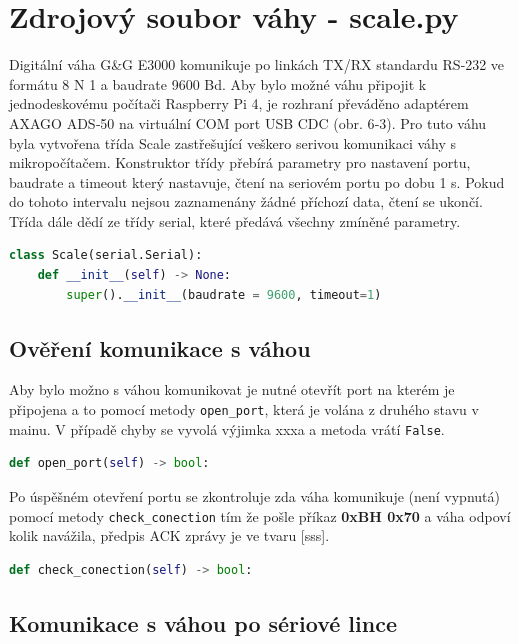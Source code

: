 \section{Zdrojový soubor váhy - scale.py}
\label{sec: scale.py}
Digitální váha G\&G E3000 komunikuje po linkách TX/RX standardu RS‑232 ve formátu 8 N 1 a baudrate 9600 Bd. Aby bylo možné váhu připojit k jednodeskovému počítači Raspberry Pi 4, je rozhraní převáděno adaptérem AXAGO ADS‑50 na virtuální COM port USB CDC (obr. 6‑3). Pro tuto váhu byla vytvořena třída Scale zastřešující veškero serivou komunikaci váhy s mikropočítačem. Konstruktor třídy přebírá parametry pro nastavení portu, baudrate a timeout který nastavuje, čtení na seriovém portu po dobu 1 s. Pokud do tohoto intervalu nejsou zaznamenány žádné příchozí data, čtení se ukončí. Třída dále dědí ze třídy serial, které předává všechny zmíněné parametry.

\begin{lstlisting}[language=Python,breaklines=false, frame=single]
class Scale(serial.Serial):
    def __init__(self) -> None:
        super().__init__(baudrate = 9600, timeout=1)
\end{lstlisting}

\subsection{Ověření komunikace s váhou}
Aby bylo možno s váhou komunikovat je nutné otevřít port na kterém je připojena a to pomocí metody \texttt{open\_port}, která je volána z druhého stavu v mainu. V případě chyby se vyvolá výjimka xxxa a metoda vrátí \texttt{False}.

\begin{lstlisting}[language=Python,breaklines=false, frame=single]
def open_port(self) -> bool:
\end{lstlisting}

Po úspěšném otevření portu se zkontroluje zda váha komunikuje (není vypnutá) pomocí metody \texttt{check\_conection} tím že pošle příkaz \textbf{0xBH 0x70} a váha odpoví kolik navážila, předpis ACK zprávy je ve tvaru [sss].

\begin{lstlisting}[language=Python,breaklines=false, frame=single]
def check_conection(self) -> bool:
\end{lstlisting}

\subsection{Komunikace s váhou po sériové lince}

